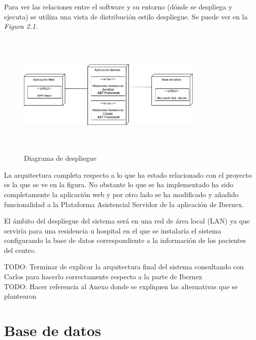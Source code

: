 

Para ver las relaciones entre el software y su entorno (dónde se despliega y ejecuta) se utiliza una vista de distribución estilo despliegue. Se puede ver en la \textit{Figura 2.1}. \newline

\begin{figure}[!h]
    \centering
    \includegraphics[width=0.8\textwidth,height=6cm]{Imagenes/Arquitectura_Sistema}
    \caption{Diagrama de despliegue}
    \label{fig:despliegue}
\end{figure}

La arquitectura completa respecto a lo que ha estado relacionado con el proyecto es la que se ve en la figura. No obstante lo que se ha implementado ha sido completamente la aplicación web y por otro lado se ha modificado y añadido funcionalidad a la Plataforma Asistencial Servidor de la aplicación de Ibernex. \newline

El ámbito del despliegue del sistema será en una red de área local (LAN) ya que serviría para una residencia u hospital en el que se instalaría el sistema configurando la base de datos correspondiente a la información de los pacientes del centro. \newline


TODO: Terminar de explicar la arquitectura final del sistema consultando con Carlos para hacerlo correctamente respecto a la parte de Ibernex\\

TODO: Hacer referencia al Anexo donde se expliquen las alternativas que se plantearon


\section{Base de datos}

